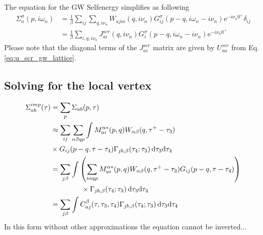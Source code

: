 \documentclass[12pt,a4paper]{scrartcl}
\numberwithin{equation}{section}
\begin{document}
The equation for the GW Selfenergy simplifies as following
\begin{align}
 \Sigma^{\sigma}_{a}(p,i\omega_n)
%
&= \frac{1}{\beta}\sum_{ij}\sum_{q,i\nu_n}  W_{ajia}(q,i\nu_n)  
                  G^{\sigma}_{ij}(p-q,i\omega_n-i\nu_n) \mathrm{e}^{-i\nu_n0^+} \delta_{ij} \\
&= \frac{1}{\beta}\sum_{i,q,i\nu_n}  J^{scr}_{ai}(q,i\nu_n)  
                  G^{\sigma}_{i}(p-q,i\omega_n-i\nu_n) \mathrm{e}^{-i\nu_n0^+}                
\end{align}
Please note that the diagonal terms of the $J^{scr}_{ai}$ matrix are given by $U^{scr}_{aa}$
from Eq.\eqref{eq:u_scr_gw_lattice}.

\subsection{Solving for the local vertex}
\begin{align}
\Sigma^{imp}_{ab}(\tau)
%
&= \sum_{p} \Sigma_{ab}(p,\tau) \\
%
&\approx \sum_{ij}\sum_{\alpha\beta qp}
   \int M^{\alpha*}_{ai}(p,q) 
     W_{\alpha\beta}(q,\tau^+ -\tau_3)  \nonumber\\
  &\times  G_{ij}(p-q,\tau-\tau_4) 
   \Gamma_{jb,\beta}(\tau_4;\tau_3) \, \mathrm{d}\tau_3\mathrm{d}\tau_4 \\
%
&=\sum_{j\beta } \int \left( \sum_{i \alpha qp}
    M^{\alpha*}_{ai}(p,q) 
     W_{\alpha\beta}(q,\tau^+ -\tau_3)G_{ij}(p-q,\tau-\tau_4) \right)   \nonumber\\
  &\hspace{1.5cm}\times  
   \Gamma_{jb,\beta}(\tau_4;\tau_3) \, \mathrm{d}\tau_3\mathrm{d}\tau_4 \\
%
&= \sum_{j\beta } \int C^{\beta}_{aj}(\tau,\tau_3,\tau_4) 
                  \Gamma_{jb,\beta}(\tau_4;\tau_3) \, \mathrm{d}\tau_3\mathrm{d}\tau_4 
%
\end{align}
In this form without other approximations the equation cannot be inverted...

\clearpage 

\end{document}
